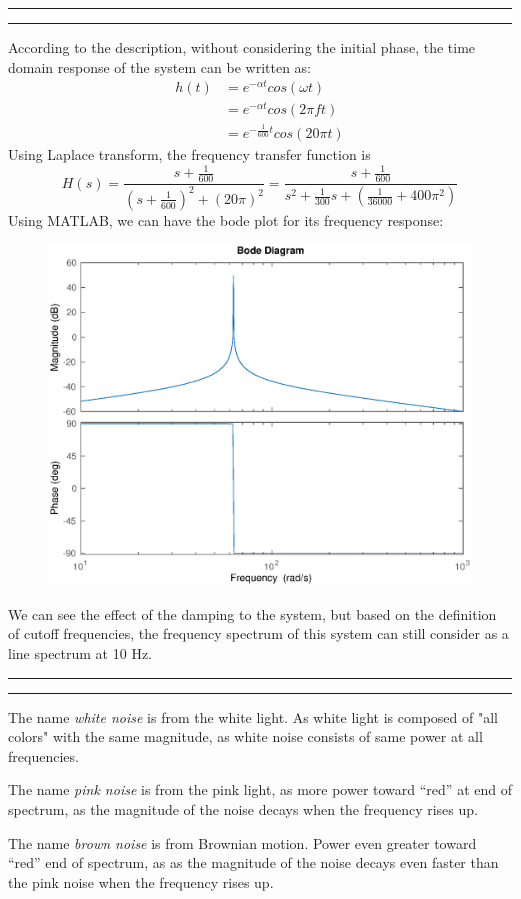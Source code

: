 \documentclass[11pt]{article}
\newcounter{questionCounter}
\newcounter{partCounter}[questionCounter]
\newenvironment{question}[2][\arabic{questionCounter}]{%
    \addtocounter{questionCounter}{1}%
    \setcounter{partCounter}{0}%
    \vspace{.25in} \hrule \vspace{0.5em}%
        \noindent{\bf #2}%
    \vspace{0.8em} \hrule \vspace{.10in}%
}{}
\begin{document}
\begin{question}{Problem 3}
According to the description, without considering the initial phase, the time domain response of the system can be written as:
\begin{align*}
    h(t) &= e^{-\alpha t}cos(\omega t) \\
    &= e^{-\alpha t}cos(2 \pi f t) \\
    &= e^{-\frac{1}{600}t}cos(20 \pi t)
\end{align*}
Using Laplace transform, the frequency transfer function is
\begin{equation}
    H(s) = \frac{s + \frac{1}{600}}{(s+\frac{1}{600})^2 + (20\pi)^2} = \frac{s + \frac{1}{600}}{s^2 + \frac{1}{300}s + (\frac{1}{36000}+400\pi^2)}
\end{equation}
Using MATLAB, we can have the bode plot for its frequency response:
\begin{figure}[ht]
    \includegraphics[width=12cm]{p3.eps}
    \centering
\end{figure}
We can see the effect of the damping to the system, but based on the definition of cutoff frequencies, the frequency spectrum of this system can still consider as a line spectrum at 10 Hz. 
\end{question}

\begin{question}{Problem 4}
    The name \textit{white noise} is from the white light. As white light is composed of "all colors" with the same magnitude, as white noise consists of same power at all frequencies.
    
    The name \textit{pink noise} is from the pink light, as more power toward “red” at end of spectrum, as the magnitude of the noise decays when the frequency rises up. 
    
    The name \textit{brown noise} is from Brownian motion. Power even greater toward “red” end of spectrum, as as the magnitude of the noise decays even faster than the pink noise when the frequency rises up.
\end{question}
\end{document}
